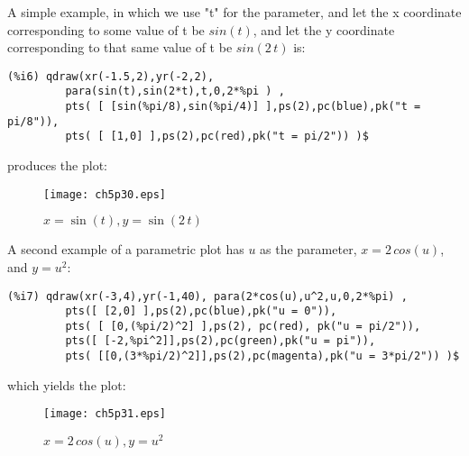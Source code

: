 \documentclass[12pt]{article}
\begin{document}
\smallskip
A simple  example, in which we use "t" for the parameter,
  and let the x coordinate corresponding to some value of
  t be $sin(t)$, and let the y coordinate corresponding
  to that same value of t be $sin(2\,t)$ is:
\small
\begin{verbatim}
(%i6) qdraw(xr(-1.5,2),yr(-2,2), 
         para(sin(t),sin(2*t),t,0,2*%pi ) ,
         pts( [ [sin(%pi/8),sin(%pi/4)] ],ps(2),pc(blue),pk("t = pi/8")),
         pts( [ [1,0] ],ps(2),pc(red),pk("t = pi/2")) )$
\end{verbatim}
\normalsize
%  
produces the plot:
\begin{figure} [h]
   \centerline{\texttt{[image: ch5p30.eps]} }
	\caption{$x = \sin(t), y = \sin(2\,t) $ }
\end{figure}      

\newpage

A second example of a parametric plot has $u$ as the parameter,
  $x = 2\,cos(u)$, and $y = u^2$:
\small
\begin{verbatim}
(%i7) qdraw(xr(-3,4),yr(-1,40), para(2*cos(u),u^2,u,0,2*%pi) ,
         pts([ [2,0] ],ps(2),pc(blue),pk("u = 0")),
         pts( [ [0,(%pi/2)^2] ],ps(2), pc(red), pk("u = pi/2")),
         pts([ [-2,%pi^2]],ps(2),pc(green),pk("u = pi")),
         pts( [[0,(3*%pi/2)^2]],ps(2),pc(magenta),pk("u = 3*pi/2")) )$
\end{verbatim}
\normalsize
%


which yields the plot:

\begin{figure} [h]
   \centerline{\texttt{[image: ch5p31.eps]} }
	\caption{$x = 2\,cos(u), y = u^2 $ }
\end{figure}      
\end{document}
